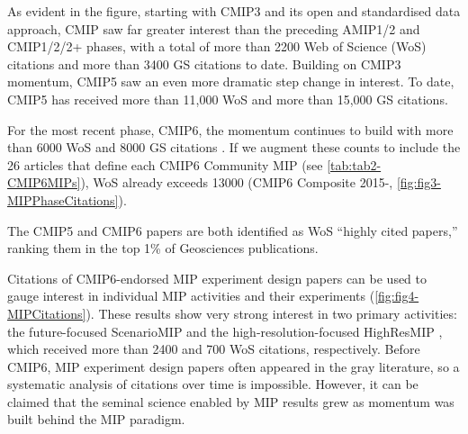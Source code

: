 \documentclass[manuscript]{copernicus}
\begin{document}
As evident in the figure, starting with CMIP3 \citep{meehl_global_2007} and its open and standardised data approach, CMIP saw far greater interest than the preceding AMIP1/2 and CMIP1/2/2+ phases, with a total of more than 2200 Web of Science (WoS) citations and more than 3400 GS citations to date. Building on CMIP3 momentum, CMIP5 saw an even more dramatic step change in interest. To date, CMIP5 \citep{taylor_overview_2012} has received more than 11,000 WoS and more than 15,000 GS citations.

For the most recent phase, CMIP6, the momentum continues to build with more than 6000 WoS and 8000 GS citations \citep{eyring_overview_2016}. If we augment these counts to include the 26 articles that define each CMIP6 Community MIP (see \autoref{tab:tab2-CMIP6MIPs}), WoS already exceeds 13000 (CMIP6 Composite 2015-, \autoref{fig:fig3-MIPPhaseCitations}).

The CMIP5 \citep{taylor_overview_2012} and CMIP6 \citep{eyring_overview_2016} papers are both identified as WoS ``highly cited papers,'' ranking them in the top 1\% of Geosciences publications.

Citations of  CMIP6-endorsed MIP experiment design papers can be used to gauge interest in individual MIP activities and their experiments (\autoref{fig:fig4-MIPCitations}). These results show very strong interest in two primary activities: the future-focused ScenarioMIP \citep{oneill_scenario_2016} and the high-resolution-focused HighResMIP \citep{haarsma_high_2016}, which received more than 2400 and 700 WoS citations, respectively. Before CMIP6, MIP experiment design papers often appeared in the gray literature, so a systematic analysis of citations over time is impossible. However, it can be claimed that the seminal science enabled by MIP results grew as momentum was built behind the MIP paradigm.
\end{document}
